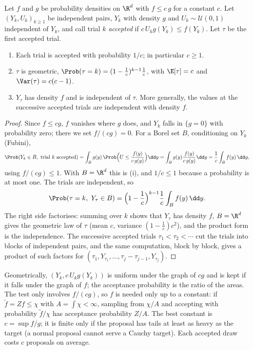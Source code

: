 \begin{proposition}\label{prop:rng-rejection}
Let $f$ and $g$ be probability densities on $\R^d$ with $f\le c\,g$ for a constant $c$.
Let $(Y_k,U_k)_{k\ge1}$ be independent pairs, $Y_k$ with density $g$ and $U_k\sim\mathcal U(0,1)$
independent of $Y_k$, and call trial $k$ \emph{accepted} if $c\,U_kg(Y_k)\le f(Y_k)$. Let
$\tau$ be the first accepted trial.
\begin{enumerate}[label=(\roman*)]
  \item Each trial is accepted with probability $1/c$; in particular $c\ge1$.
  \item $\tau$ is geometric, $\Prob(\tau=k)=(1-\frac1c)^{k-1}\frac1c$, with
    $\E[\tau]=c$ and $\Var(\tau)=c(c-1)$.
  \item $Y_\tau$ has density $f$ and is independent of $\tau$. More generally, the values at
    the successive accepted trials are independent with density $f$.
\end{enumerate}
\end{proposition}

\begin{proof}
Since $f\le cg$, $f$ vanishes where $g$ does, and $Y_k$ falls in $\{g=0\}$ with probability
zero; there we set $f/(cg)=0$. For a Borel set $B$, conditioning on $Y_k$ (Fubini),
\[
  \Prob(Y_k\in B,\ \text{trial }k\text{ accepted})
  =\int_B g(y)\,\Prob\Big(U\le\frac{f(y)}{c\,g(y)}\Big)\dd y=\int_B g(y)\frac{f(y)}{c\,g(y)}\dd y
  =\frac1c\int_Bf(y)\,\dd y,
\]
using $f/(cg)\le1$. With $B=\R^d$ this is (i), and $1/c\le1$ because a probability is at
most one. The trials are independent, so
\[
  \Prob(\tau=k,\ Y_\tau\in B)=\Big(1-\frac1c\Big)^{k-1}\frac1c\int_Bf(y)\,\dd y .
\]
The right side factorises: summing over $k$ shows that $Y_\tau$ has density $f$, $B=\R^d$
gives the geometric law of $\tau$ (mean $c$, variance $(1-\frac1c)c^2$), and the product form
is the independence. The successive accepted trials $\tau_1<\tau_2<\cdots$ cut the trials
into blocks of independent pairs, and the same computation, block by block, gives a product
of such factors for $(\tau_1,Y_{\tau_1},\dots,\tau_j-\tau_{j-1},Y_{\tau_j})$.
\end{proof}

Geometrically, $(Y_k,c\,U_kg(Y_k))$ is uniform under the graph of $cg$ and is kept if it falls
under the graph of $f$; the acceptance probability is the ratio of the areas. The test only
involves $f/(cg)$, so $f$ is needed only up to a constant: if $\tilde f=Zf\le\chi$ with
$A=\int\chi<\infty$, sampling from $\chi/A$ and accepting with probability $\tilde f/\chi$ has
acceptance probability $Z/A$. The best constant is $c=\sup f/g$; it is finite only if the
proposal has tails at least as heavy as the target (a normal proposal cannot serve a Cauchy
target). Each accepted draw costs $c$ proposals on average.

